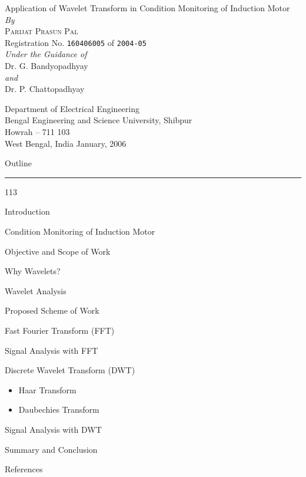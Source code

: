 \documentclass[a4,portrait,slidesonly]{seminar}
\begin{document}
\begin{slide*}
\begin{center}
{\large \textsf{Application of Wavelet Transform in Condition Monitoring of Induction Motor}}\\
\vspace{20pt}
{\small \emph{By}}\\
\textsc{Parijat Prasun Pal}\\
Registration No. \texttt{160406005} of \texttt{2004-05}\\
\vspace{20pt}
{\small \emph{Under the Guidance of}}\\
Dr. G. Bandyopadhyay\\
{\small \emph{and}}\\
Dr. P. Chattopadhyay\\

\vspace{20pt}
\vspace{20mm}
\vspace{20pt}

\textsf{Department of Electrical Engineering}\\
Bengal Engineering and Science University, Shibpur\\
Howrah – 711 103\\
West Bengal, India
\vfill
January, 2006
\end{center}
\end{slide*}

\begin{slide*}
{\large \textsf{Outline}}\\
\hrule
\vspace{10pt}
\begin{dinglist} {113}
\item Introduction
\item Condition Monitoring of Induction Motor
\item Objective and Scope of Work
\item Why Wavelets?
\item Wavelet Analysis
\item Proposed Scheme of Work
\item Fast Fourier Transform (FFT)
\item Signal Analysis with FFT
\item Discrete Wavelet Transform (DWT)
    \begin{itemize}
    \item Haar Transform
    \item Daubechies Transform
    \end{itemize}
\item Signal Analysis with DWT
\item Summary and Conclusion
\item References
\end{dinglist}
\end{slide*}
\end{document}
